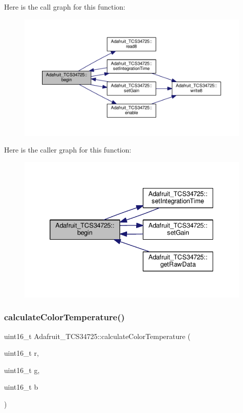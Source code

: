 Here is the call graph for this function\+:\nopagebreak
\begin{figure}[H]
\begin{center}
\leavevmode
\includegraphics[width=350pt]{class_adafruit___t_c_s34725_a568d79b6382ac27010a8afc26cbdae79_cgraph}
\end{center}
\end{figure}
Here is the caller graph for this function\+:\nopagebreak
\begin{figure}[H]
\begin{center}
\leavevmode
\includegraphics[width=332pt]{class_adafruit___t_c_s34725_a568d79b6382ac27010a8afc26cbdae79_icgraph}
\end{center}
\end{figure}
\mbox{\label{class_adafruit___t_c_s34725_a9c6c7ab8a84a47a65ff04a125bcfee92}} 
\subsubsection{\texorpdfstring{calculate\+Color\+Temperature()}{calculateColorTemperature()}}
{\footnotesize\ttfamily uint16\+\_\+t Adafruit\+\_\+\+T\+C\+S34725\+::calculate\+Color\+Temperature (\begin{DoxyParamCaption}\item[{uint16\+\_\+t}]{r,  }\item[{uint16\+\_\+t}]{g,  }\item[{uint16\+\_\+t}]{b }\end{DoxyParamCaption})}



